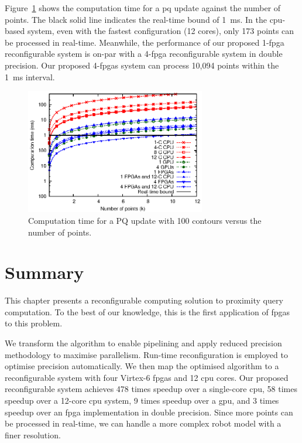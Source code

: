 Figure~\ref{fig:scalability} shows the computation time for a \gls{pq} update against the number of points.
The black solid line indicates the real-time bound of 1~ms.
In the \gls{cpu}-based system, even with the fastest configuration (12 cores), only 173 points can be processed in real-time.
Meanwhile, the performance of our proposed 1-\gls{fpga} reconfigurable system is on-par with a 4-\gls{fpga} reconfigurable system in double precision.
Our proposed 4-\gls{fpga}s system can process 10,094 points within the 1~ms interval.

\begin{figure}[ht]
\begin{center}
\includegraphics[width=0.7\textwidth]{3_precision/figures/fig_scalability}
\end{center}
\caption{Computation time for a PQ update with 100 contours versus the number of points.}
\label{fig:scalability}
\end{figure}

\section{Summary}
\label{sec:precision_summary}

This chapter presents a reconfigurable computing solution to proximity query computation.
To the best of our knowledge, this is the first application of \glspl{fpga} to this problem.

We transform the algorithm to enable pipelining and apply reduced precision methodology to maximise parallelism.
Run-time reconfiguration is employed to optimise precision automatically.
We then map the optimised algorithm to a reconfigurable system with four Virtex-6 \gls{fpga}s and 12 \gls{cpu} cores.
Our proposed reconfigurable system achieves 478 times speedup over a single-core \gls{cpu}, 58 times speedup over a 12-core \gls{cpu} system, 9 times speedup over a \gls{gpu},
and 3 times speedup over an \gls{fpga} implementation in double precision.
Since more points can be processed in real-time, we can handle a more complex robot model with a finer resolution.
